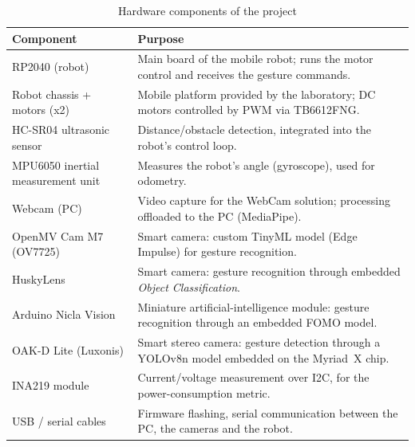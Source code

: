 \documentclass[12pt,a4paper]{report}
\begin{document}
	\begin{table}[H]
		\centering
		\renewcommand{\arraystretch}{1.5}
		\begin{tabularx}{\textwidth}{|l|X|}
			\hline
			\textbf{Component} & \textbf{Purpose} \\
			\hline
			RP2040 (robot) & Main board of the mobile robot; runs the motor control and receives the gesture commands. \\
			\hline
			Robot chassis + motors (x2) & Mobile platform provided by the laboratory; DC motors controlled by PWM via TB6612FNG. \\
			\hline
			HC-SR04 ultrasonic sensor & Distance/obstacle detection, integrated into the robot's control loop. \\
			\hline
			MPU6050 inertial measurement unit & Measures the robot's angle (gyroscope), used for odometry. \\
			\hline
			Webcam (PC) & Video capture for the WebCam solution; processing offloaded to the PC (MediaPipe). \\
			\hline
			OpenMV Cam M7 (OV7725) & Smart camera: custom TinyML model (Edge Impulse) for gesture recognition. \\
			\hline
			HuskyLens & Smart camera: gesture recognition through embedded \textit{Object Classification}. \\
			\hline
			Arduino Nicla Vision & Miniature artificial-intelligence module: gesture recognition through an embedded FOMO model. \\
			\hline
			OAK-D Lite (Luxonis) & Smart stereo camera: gesture detection through a YOLOv8n model embedded on the Myriad~X chip. \\
			\hline
			INA219 module & Current/voltage measurement over I2C, for the power-consumption metric. \\
			\hline
			USB / serial cables & Firmware flashing, serial communication between the PC, the cameras and the robot. \\
			\hline
		\end{tabularx}
		\caption{Hardware components of the project}
	\end{table}
	
\end{document}
